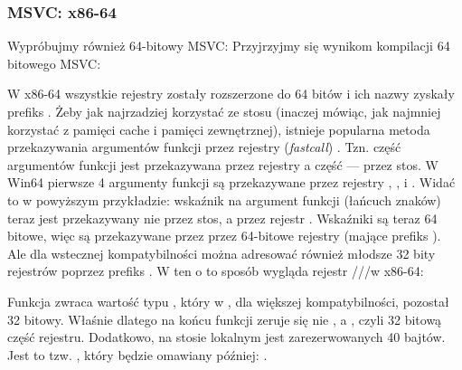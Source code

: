 \subsubsection{MSVC: x86-64}

Wypróbujmy również 64-bitowy MSVC:
Przyjrzyjmy się wynikom kompilacji 64 bitowego MSVC:




W x86-64 wszystkie rejestry zostały rozszerzone do 64 bitów i ich nazwy zyskały prefiks .
Żeby jak najrzadziej korzystać ze stosu (inaczej mówiąc, jak najmniej korzystać z pamięci cache i pamięci zewnętrznej), istnieje popularna metoda przekazywania argumentów funkcji przez rejestry (\emph{fastcall}) .
Tzn. część argumentów funkcji jest przekazywana przez rejestry a część --- przez stos.
W Win64 pierwsze 4 argumenty funkcji są przekazywane przez rejestry \RCX, \RDX,  i .
Widać to w powyższym przykładzie: wskaźnik na argument funkcji \printf (łańcuch znaków) teraz jest przekazywany nie przez stos, a przez rejestr \RCX.
Wskaźniki są teraz 64 bitowe, więc są przekazywane przez przez 64-bitowe rejestry (mające prefiks ).
Ale dla wstecznej kompatybilności można adresować również młodsze 32 bity rejestrów poprzez prefiks .
W ten o to sposób wygląda rejestr \RAX/\EAX/\AX/\AL w x86-64:


Funkcja \main zwraca wartość typu \Tint, który w \CCpp, dla większej kompatybilności,
pozostał 32 bitowy. Właśnie dlatego na końcu funkcji \main zeruje się nie \RAX, a \EAX, czyli 32 bitową część rejestru.
Dodatkowo, na stosie lokalnym jest zarezerwowanych 40 bajtów.
Jest to tzw. , który będzie omawiany później: .

